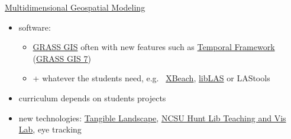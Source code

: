 \documentclass[xcolor={dvipsnames,usenames},beamer]{beamer}
\begin{document}
\begin{frame}{\coursesTitle}

\begin{columns}[c]


\begin{block}{\href{http://courses.ncsu.edu/mea592/common/}%
  {Multidimensional Geospatial Modeling}}

\begin{itemize}
 \item software:
 \begin{itemize}
   \item \href{http://grass.osgeo.org}{GRASS GIS}
   {\scriptsize
    often with new features such as
    \href{http://grass.osgeo.org/grass70/manuals/temporalintro.html}{Temporal Framework}
    (\href{http://grass.osgeo.org/grass7/}{GRASS GIS 7})
   }
  \item + whatever the students need, e.g.~%
    \href{http://oss.deltares.nl/web/xbeach/}{XBeach}, \href{http://www.liblas.org/}{libLAS}
    or LAStools
 \end{itemize}

 \item curriculum depends on students projects
 \item new technologies:
   \href{http://geospatial.ncsu.edu/osgeorel/tangible-landscape.html}%
   {Tangible Landscape},
   \href{https://www.lib.ncsu.edu/spaces/teaching-and-visualization-lab}%
           {NCSU Hunt Lib Teaching and Vis Lab},
   eye tracking

\end{itemize}

\end{block}



\end{columns}
\end{frame}
\end{document}
